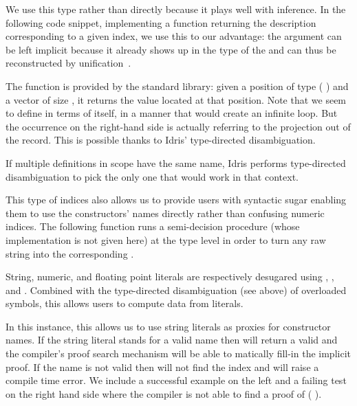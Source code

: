 
We use this type rather than  directly because it
plays well with inference.
%
In the following code snippet, implementing a function returning
the description corresponding to a given index,
we use this to our advantage:
the  argument can be left implicit because it already
shows up in the type of the  and can thus be
reconstructed by unification~\citep{DBLP:conf/tlca/AbelP11}.


The  function is provided by the standard
library: given a position of type ( )
and a vector of size , it returns the value located
at that position.
%
Note that we seem to define 
in terms of itself, in a manner that would create an
infinite loop.
%
But the occurrence on the right-hand side is actually
referring to the projection out of the
 record.
%
This is possible thanks to Idris' type-directed disambiguation.

\begin{remark}
  If multiple definitions in scope have the same name,
  Idris performs type-directed disambiguation to pick
  the only one that would work in that context.
\end{remark}

This type of indices also allows us to provide users with
syntactic sugar enabling them to use the constructors' names
directly rather than confusing numeric indices.
%
The following function runs a semi-decision procedure
 (whose implementation is
not given here) at the type level
in order to turn any raw string 
into the corresponding .


\begin{remark}
  String, numeric, and floating point literals are respectively
  desugared using , , and
  .
  Combined with the type-directed disambiguation (see above)
  of overloaded symbols, this allows users to compute data from literals.
\end{remark}

In this instance, this allows us to use string literals as
proxies for constructor names.
%
If the string literal stands for a valid name then
 will
return a valid  and the compiler's proof
search mechanism will be able to
matically fill-in the implicit proof.
%
If the name is not valid then \idris{} will not
find the index and will raise a compile time error.
%
We include a successful example on the left and a failing test
on the right hand side where the compiler is not able to find
a proof of ( \IdrisKeyword{(}
 
\IdrisKeyword{)}).

